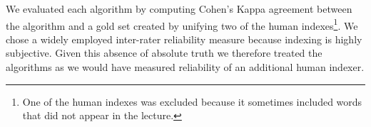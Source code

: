 
We evaluated each algorithm by computing Cohen's Kappa agreement
between the algorithm and a gold set created by unifying two of the
human indexes\footnote{One of the human indexes was excluded because
  it sometimes included words that did not appear in the lecture.}.
We chose a widely employed inter-rater reliability measure because
indexing is highly subjective. Given this absence of absolute truth
we therefore treated the algorithms as we would have measured
reliability of an additional human indexer.

%
%

